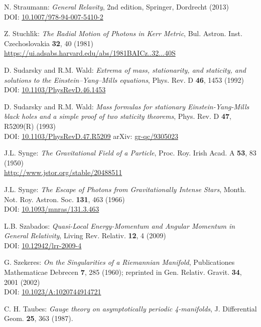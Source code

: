 \begin{thebibliography}{123}
N. Straumann: \emph{General Relavity}, 2nd edition,
Springer, Dordrecht (2013)\\
DOI: \href{https://doi.org/10.1007/978-94-007-5410-2}{10.1007/978-94-007-5410-2}

Z. Stuchl\'{\i}k: {\em The Radial Motion of Photons in Kerr Metric},
Bul. Astron. Inst. Czechoslovakia {\bf 32}, 40 (1981)\\
\url{https://ui.adsabs.harvard.edu/abs/1981BAICz..32...40S}

D. Sudarsky and R.M. Wald: {\em Extrema of mass, stationarity, and staticity,
and solutions to the Einstein–Yang–Mills equations},
Phys. Rev. D {\bf 46}, 1453 (1992)\\
DOI: \href{https://doi.org/10.1103/PhysRevD.46.1453}{10.1103/PhysRevD.46.1453}

D. Sudarsky and R.M. Wald:
{\em Mass formulas for stationary Einstein-Yang-Mills black holes and a simple proof of two staticity theorems},
Phys. Rev. D {\bf 47}, R5209(R) (1993)\\
DOI: \href{https://doi.org/10.1103/PhysRevD.47.R5209}{10.1103/PhysRevD.47.R5209}\hfill
arXiv: \href{https://arxiv.org/abs/gr-qc/9305023}{gr-qc/9305023}

J.L. Synge: {\em The Gravitational Field of a Particle},
Proc. Roy. Irish Acad. A {\bf 53}, 83 (1950)\\
\url{http://www.jstor.org/stable/20488511}

J.L. Synge: {\em The Escape of Photons from Gravitationally Intense Stars},
Month. Not. Roy. Astron. Soc. {\bf 131}, 463 (1966)\\
DOI: \href{https://doi.org/10.1093/mnras/131.3.463}{10.1093/mnras/131.3.463}

L.B. Szabados:
{\em Quasi-Local Energy-Momentum and Angular Momentum in General Relativity},
Living Rev. Relativ. {\bf 12}, 4 (2009)\\
DOI: \href{https://doi.org/10.12942/lrr-2009-4}{10.12942/lrr-2009-4}

G. Szekeres: {\em On the Singularities of a Riemannian Manifold},
Publicationes Mathematicae Debrecen {\bf 7}, 285 (1960); reprinted in
Gen. Relativ. Gravit. {\bf 34}, 2001 (2002)\\
DOI: \href{https://doi.org/10.1023/A:1020744914721}{10.1023/A:1020744914721}

C. H. Taubes: {\em Gauge theory on asymptotically periodic 4-manifolds},
J. Differential Geom. {\bf 25}, 363 (1987).


\end{thebibliography}

